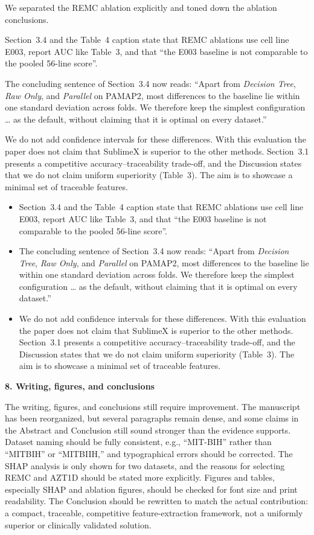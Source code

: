 \documentclass[11pt]{article}
\makeatletter
\newcommand{\rsp}{\par\vspace{0.9em}}
\newcommand{\rcitem}[2]{\begin{reviewerbox}\textbf{#1}\par\smallskip#2\end{reviewerbox}}
\newcommand{\response}[2]{%
  \begin{responsebox}#1%
  \def\@responseitems{#2}%
  \ifx\@responseitems\empty\else\begin{itemize}[nosep,leftmargin=1.2em]#2\end{itemize}\fi
  \end{responsebox}\rsp}
\makeatother
\begin{document}
\response{We separated the REMC ablation explicitly and toned down the ablation conclusions.}{
  \item Section~3.4 and the Table~4 caption state that REMC ablations use cell line E003, report AUC
    like Table~3, and that ``the E003 baseline is not comparable to the pooled 56-line score''.
  \item The concluding sentence of Section~3.4 now reads: ``Apart from \emph{Decision Tree},
    \emph{Raw Only}, and \emph{Parallel} on PAMAP2, most differences to the baseline lie within one
    standard deviation across folds. We therefore keep the simplest configuration \ldots{} as the
    default, without claiming that it is optimal on every dataset.''
  \item We do not add confidence intervals for these differences. With this evaluation the paper
    does not claim that SublimeX is superior to the other methods. Section~3.1 presents a
    competitive accuracy--traceability trade-off, and the Discussion states that we do not claim
    uniform superiority (Table~3). The aim is to showcase a minimal set of traceable features.
}

\rcitem{8. Writing, figures, and conclusions}{The writing, figures, and conclusions still require
improvement. The manuscript has been reorganized, but several paragraphs remain dense, and some claims
in the Abstract and Conclusion still sound stronger than the evidence supports. Dataset naming should
be fully consistent, e.g., ``MIT-BIH'' rather than ``MITBIH'' or ``MITBIIH,'' and typographical errors
should be corrected. The SHAP analysis is only shown for two datasets, and the reasons for selecting
REMC and AZT1D should be stated more explicitly. Figures and tables, especially SHAP and ablation
figures, should be checked for font size and print readability. The Conclusion should be rewritten to
match the actual contribution: a compact, traceable, competitive feature-extraction framework, not a
uniformly superior or clinically validated solution.}
\end{document}
